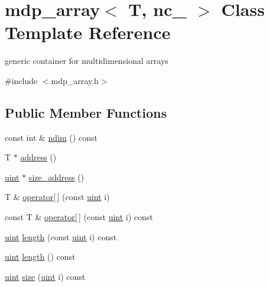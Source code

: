 \hypertarget{classmdp__array}{}\section{mdp\+\_\+array$<$ T, nc\+\_\+ $>$ Class Template Reference}
\label{classmdp__array}


generic container for multidimensional arrays  




{\ttfamily \#include $<$mdp\+\_\+array.\+h$>$}

\subsection*{Public Member Functions}
\begin{DoxyCompactItemize}
\item 
const int \& \hyperlink{classmdp__array_af02f14ceeabfffe09035f8d06222c174}{ndim} () const
\item 
T $\ast$ \hyperlink{classmdp__array_a9b5419e65691954be0a3b6598a47366a}{address} ()
\item 
\hyperlink{mdp__global__vars_8h_a91ad9478d81a7aaf2593e8d9c3d06a14}{uint} $\ast$ \hyperlink{classmdp__array_aee0c0b97d3f8bb9d3f8ecedb77d14e6d}{size\+\_\+address} ()
\item 
T \& \hyperlink{classmdp__array_acc0201400e730c01bd131696ff206aa6}{operator\mbox{[}$\,$\mbox{]}} (const \hyperlink{mdp__global__vars_8h_a91ad9478d81a7aaf2593e8d9c3d06a14}{uint} i)
\item 
const T \& \hyperlink{classmdp__array_ad828b0dd46b91b075de47a242e924edf}{operator\mbox{[}$\,$\mbox{]}} (const \hyperlink{mdp__global__vars_8h_a91ad9478d81a7aaf2593e8d9c3d06a14}{uint} i) const
\item 
\hyperlink{mdp__global__vars_8h_a91ad9478d81a7aaf2593e8d9c3d06a14}{uint} \hyperlink{classmdp__array_a6a548619f489cfb3d86d06d6e7100050}{length} (const \hyperlink{mdp__global__vars_8h_a91ad9478d81a7aaf2593e8d9c3d06a14}{uint} i) const
\item 
\hyperlink{mdp__global__vars_8h_a91ad9478d81a7aaf2593e8d9c3d06a14}{uint} \hyperlink{classmdp__array_a702c88d9f7db9b6e86184a98cf85e617}{length} () const
\item 
\hyperlink{mdp__global__vars_8h_a91ad9478d81a7aaf2593e8d9c3d06a14}{uint} \hyperlink{classmdp__array_aa4d57a7f99a8889e70314e0116f59eee}{size} (\hyperlink{mdp__global__vars_8h_a91ad9478d81a7aaf2593e8d9c3d06a14}{uint} i) const
\item 

\end{DoxyCompactItemize}
